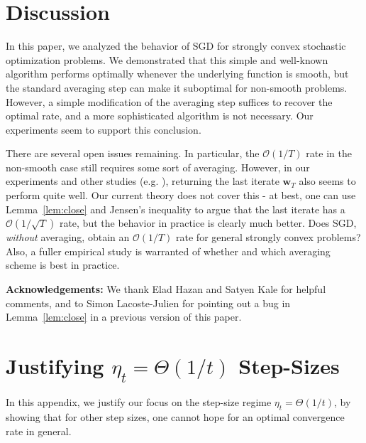\documentclass{article}
\newcommand{\bw}{\mathbf{w}}
\newcommand{\Ocal}{\mathcal{O}}
\newcommand{\lemref}[1]{Lemma~\ref{#1}}
\begin{document}
\section{Discussion}\label{sec:discussion}

In this paper, we analyzed the behavior of SGD for strongly convex stochastic optimization problems. We demonstrated that this simple and well-known algorithm performs optimally whenever the underlying function is smooth, but the standard averaging step can make it suboptimal for non-smooth problems. However, a simple modification of the averaging step suffices to recover the optimal rate, and a more sophisticated algorithm is not necessary. Our experiments seem to support this conclusion.

There are several open issues remaining. In particular, the $\Ocal(1/T)$ rate in the non-smooth case still requires some sort of averaging. However, in our experiments and other studies (e.g. \cite{ShaSiSreCo11}), returning the last iterate $\bw_T$ also seems to perform quite well. Our current theory does not cover this - at best, one can use \lemref{lem:close} and Jensen's inequality to argue that the last iterate has a $\Ocal(1/\sqrt{T})$ rate, but the behavior in practice is clearly much better. Does SGD, \emph{without} averaging, obtain an $\Ocal(1/T)$ rate for general strongly convex problems? Also, a fuller empirical study is warranted of whether and which averaging scheme is best in practice.

\textbf{Acknowledgements:} We thank Elad Hazan and Satyen Kale for helpful comments, and to Simon Lacoste-Julien for pointing out a bug in \lemref{lem:close} in a previous version of this paper.












\appendix
\newpage
\onecolumn

\section{Justifying $\eta_t=\Theta(1/t)$ Step-Sizes}\label{app:etat}

In this appendix, we justify our focus on the step-size regime $\eta_t=\Theta(1/t)$, by showing that for other step sizes, one cannot hope for an optimal convergence rate in general.
\end{document}
